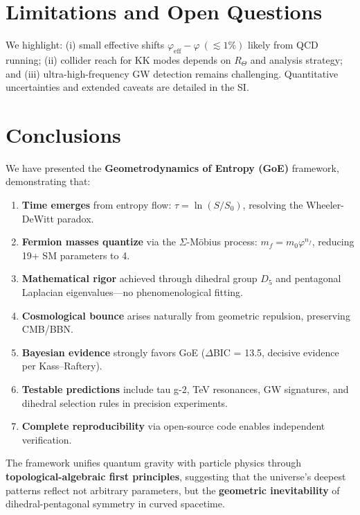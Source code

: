 \documentclass[12pt]{article}
\begin{document}

\section{Limitations and Open Questions}
\label{sec:limitations}

We highlight: (i) small effective shifts $\varphi_{\text{eff}}-\varphi\ (\lesssim1\%)$ likely from QCD running; (ii) collider reach for KK modes depends on $R_\Theta$ and analysis strategy; and (iii) ultra-high-frequency GW detection remains challenging. Quantitative uncertainties and extended caveats are detailed in the SI.

\section{Conclusions}

We have presented the \textbf{Geometrodynamics of Entropy (GoE)} framework, demonstrating that:

\begin{enumerate}
\item \textbf{Time emerges} from entropy flow: $\tau = \ln(S/S_0)$, resolving the Wheeler-DeWitt paradox.
\item \textbf{Fermion masses quantize} via the $\Sigma$-M\"obius process: $m_f = m_0 \varphi^{n_f}$, reducing 19+ SM parameters to 4.
\item \textbf{Mathematical rigor} achieved through dihedral group $D_5$ and pentagonal Laplacian eigenvalues—no phenomenological fitting.
\item \textbf{Cosmological bounce} arises naturally from geometric repulsion, preserving CMB/BBN.
\item \textbf{Bayesian evidence} strongly favors GoE ($\Delta$BIC = 13.5, decisive evidence per Kass--Raftery).
\item \textbf{Testable predictions} include tau g-2, TeV resonances, GW signatures, and dihedral selection rules in precision experiments.
\item \textbf{Complete reproducibility} via open-source code enables independent verification.
\end{enumerate}

The framework unifies quantum gravity with particle physics through \textbf{topological-algebraic first principles}, suggesting that the universe's deepest patterns reflect not arbitrary parameters, but the \textbf{geometric inevitability} of dihedral-pentagonal symmetry in curved spacetime.
\end{document}
